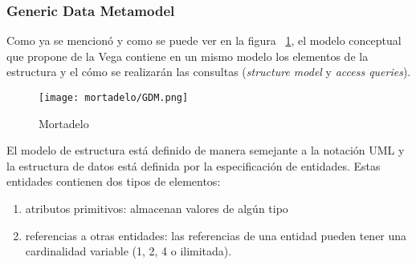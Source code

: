 \subsubsection*{Generic Data Metamodel}

Como ya se mencionó y como se puede ver en la figura ~\ref{img:mortadelo-gdm}, el modelo conceptual que propone de la Vega contiene en un mismo modelo los elementos de la estructura y el cómo se realizarán las consultas (\textit{structure model} y \textit{access queries}).


\begin{figure}[h!t] 
    \centering
    \texttt{[image: mortadelo/GDM.png]}
    \caption{Mortadelo}
    \label{img:mortadelo-gdm}
\end{figure}

El modelo de estructura está definido de manera semejante a la notación UML y la estructura de datos está definida por la especificación de entidades. Estas entidades contienen dos tipos de elementos:

\begin{enumerate}
    \item atributos primitivos: almacenan valores de algún tipo
    \item referencias a otras entidades: las referencias de una entidad pueden tener una cardinalidad variable (1, 2, 4 o ilimitada).
\end{enumerate}
